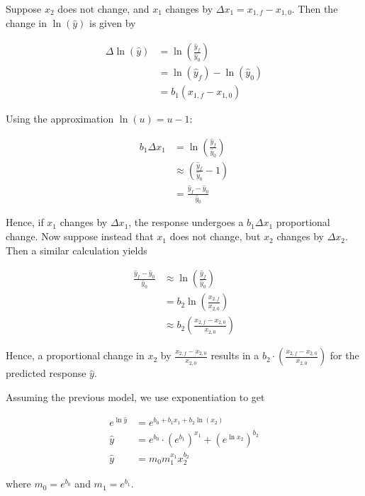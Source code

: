 \documentclass[12pt]{article}
\begin{document}
\begin{enumerate}
Suppose $x_2$ does not change, and $x_1$ changes by $\Delta x_1 = x_{1,f} - x_{1,0}$.
Then the change in $\ln(\hat{y})$ is given by

\begin{align*}
	\Delta \ln(\hat{y})
	&= \ln \left(\frac{\hat{y}_f}{\hat{y}_0}\right)\\
	&= \ln (\hat{y}_f) - \ln(\hat{y}_0)\\
	&= b_1(x_{1,f} - x_{1,0})
\end{align*}

Using the approximation $\ln(u) = u - 1$:

\begin{align*}
	b_1\Delta x_1 
	&= \ln \left(\frac{\hat{y}_f}{\hat{y}_0}\right)\\
	&\approx \left(\frac{\hat{y}_f}{\hat{y}_0} - 1\right)\\
	&=\frac{\hat{y}_f - \hat{y}_0}{\hat{y}_0}
\end{align*}

Hence, if $x_1$ changes by $\Delta x_1$, the response undergoes a $b_1\Delta x_1$
proportional change. Now suppose instead that $x_1$ does not change, but
$x_2$ changes by $\Delta x_2$. Then a similar calculation yields

\begin{align*}
	\frac{\hat{y}_f-\hat{y}_0}{\hat{y}_0}
	&\approx \ln\left(\frac{\hat{y}_f}{\hat{y}_0}\right)\\
	&=b_2\ln \left(\frac{x_{2,f}}{x_{2,0}}\right)\\
	&\approx b_2 \left(\frac{x_{2,f} - x_{2,0}}{x_{2,0}}\right)
\end{align*}

Hence, a proportional change in $x_2$ by $\frac{x_{2,f} - x_{2,0}}{x_{2,0}}$ results
in a $b_2\cdot \left(\frac{x_{2,f}-x_{2,0}}{x_{2,0}}\right)$ for the predicted response
$\hat{y}$.


Assuming the previous model, we use exponentiation to get

\begin{align*}
 e^{\ln{\hat{y}}} &= e^{b_0 + b_1  x_1+ b_2\ln(x_2)}\\
 \hat{y} &= e^{b_0}\cdot (e^{b_1})^{x_1} + (e^{\ln x_2})^{b_2}\\
 \hat{y} &= m_0 m_1^{x_1} x_2^{b_2}
\end{align*}

where $m_0 = e^{b_0}$ and $m_1 = e^{b_1}$.

\end{enumerate}
\end{document}
